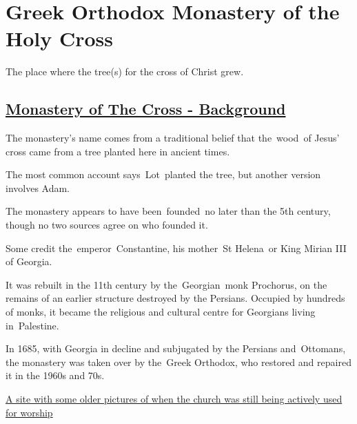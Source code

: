 \documentclass[letterpaper]{report}
\begin{document}
\clearpage
\section{Greek Orthodox Monastery of the Holy Cross}
The place where the tree(s) for the cross of Christ grew.

\subsection{
\href{http://www.seetheholyland.net/monastery-of-the-cross/}{
Monastery of The Cross - Background}}

The monastery’s name comes from a traditional belief that the wood of Jesus’ cross came from a tree planted here in ancient times.

The most common account says Lot planted the tree, but another version involves Adam.

The monastery appears to have been founded no later than the 5th century, though no two sources agree on who founded it.

Some credit the emperor Constantine, his mother St Helena or King Mirian III of Georgia.

It was rebuilt in the 11th century by the Georgian monk Prochorus, on the remains of an earlier structure destroyed by the Persians. Occupied by hundreds of monks, it became the religious and cultural centre for Georgians living in Palestine.

In 1685, with Georgia in decline and subjugated by the Persians and Ottomans, the monastery was taken over by the Greek Orthodox, who restored and repaired it in the 1960s and 70s.

\href{http://www.biblewalks.com/Sites/CrossMonastery.html}{
A site with some older pictures of when the church was still being actively used for worship}
\end{document}
